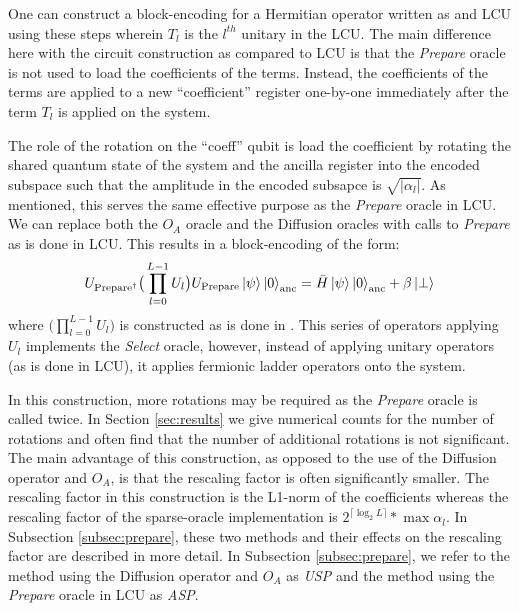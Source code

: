 One can construct a block-encoding for a Hermitian operator written as and LCU using these steps wherein $T_l$ is the $l^{th}$ unitary in the LCU.
The main difference here with the circuit construction as compared to LCU is that the \textit{Prepare} oracle is not used to load the coefficients of the terms.
Instead, the coefficients of the terms are applied to a new ``coefficient'' register one-by-one immediately after the term $T_l$ is applied on the system.

The role of the rotation on the ``coeff'' qubit is load the coefficient by rotating the shared quantum state of the system and the ancilla register into the encoded subspace such that the amplitude in the encoded subsapce is $\sqrt{| \alpha_l |}$.
As mentioned, this serves the same effective purpose as the \textit{Prepare} oracle in LCU.
We can replace both the $O_A$ oracle and the Diffusion oracles with calls to \textit{Prepare} as is done in LCU.
This results in a block-encoding of the form:
\begin{equation}
    U_{\text{Prepare}^\dagger} \big( \prod_{l=0}^{L-1} U_l \big) U_{\text{Prepare}} \ket{\psi} \ket{0}_{\text{anc}} = \bar{H} \ket{\psi} \ket{0}_{\text{anc}} + \beta \ket{\perp}
\end{equation}
where $\big( \prod_{l=0}^{L-1} U_l \big)$ is constructed as is done in \cite{camps2024explicit,liu2024efficient}.
This series of operators applying $U_l$ implements the \textit{Select} oracle, however, instead of applying unitary operators (as is done in LCU), it applies fermionic ladder operators onto the system.

In this construction, more rotations may be required as the \textit{Prepare} oracle is called twice.
In Section \ref{sec:results} we give numerical counts for the number of rotations and often find that the number of additional rotations is not significant.
The main advantage of this construction, as opposed to the use of the Diffusion operator and $O_A$, is that the rescaling factor is often significantly smaller.
The rescaling factor in this construction is the L1-norm of the coefficients whereas the rescaling factor of the sparse-oracle implementation is $2^{\lceil \log_2{L} \rceil} * \max{\alpha_l}$.
In Subsection \ref{subsec:prepare}, these two methods and their effects on the rescaling factor are described in more detail.
In Subsection \ref{subsec:prepare}, we refer to the method using the Diffusion operator and $O_A$ as \textit{USP} and the method using the \textit{Prepare} oracle in LCU as \textit{ASP}.